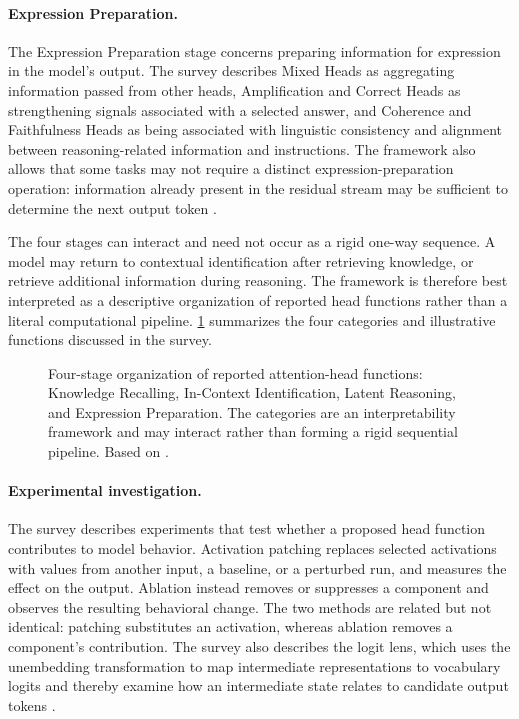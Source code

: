 \paragraph{Expression Preparation.}
The Expression Preparation stage concerns preparing information for
expression in the model's output. The survey describes Mixed Heads as
aggregating information passed from other heads, Amplification and
Correct Heads as strengthening signals associated with a selected answer,
and Coherence and Faithfulness Heads as being associated with linguistic
consistency and alignment between reasoning-related information and
instructions. The framework also allows that some tasks may not require
a distinct expression-preparation operation: information already present
in the residual stream may be sufficient to determine the next output
token \parencite{zheng2024attentionheads}.

The four stages can interact and need not occur as a rigid one-way
sequence. A model may return to contextual identification after retrieving
knowledge, or retrieve additional information during reasoning. The
framework is therefore best interpreted as a descriptive organization of
reported head functions rather than a literal computational pipeline.
\cref{fig:attn-head-framework} summarizes the four categories and
illustrative functions discussed in the survey.

\begin{figure}[htbp]
    \centering
    
    \caption{Four-stage organization of reported attention-head functions:
    Knowledge Recalling, In-Context Identification, Latent Reasoning, and
    Expression Preparation. The categories are an interpretability
    framework and may interact rather than forming a rigid sequential
    pipeline. Based on \textcite{zheng2024attentionheads}.}
    \label{fig:attn-head-framework}
\end{figure}

\paragraph{Experimental investigation.}
The survey describes experiments that test whether a proposed head
function contributes to model behavior. Activation patching replaces
selected activations with values from another input, a baseline, or a
perturbed run, and measures the effect on the output. Ablation instead removes or suppresses a component and
observes the resulting behavioral change. The two methods are related but
not identical: patching substitutes an activation, whereas ablation removes
a component's contribution. The survey also describes the logit lens,
which uses the unembedding transformation to map intermediate
representations to vocabulary logits and thereby examine how an
intermediate state relates to candidate output tokens
\parencite{zheng2024attentionheads}.

